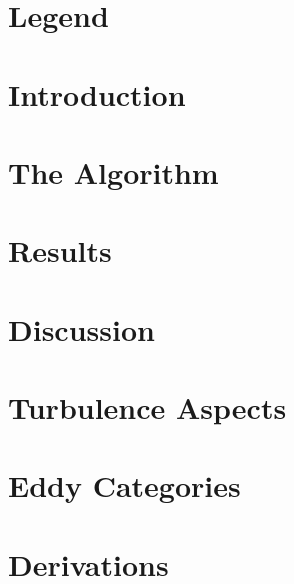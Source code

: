 


\frontmatter
%
%
%
\tableofcontents %
\chapter{Legend}
\newpage

\FloatBarrier

\mainmatter
\chapter{Introduction}

\chapter{The Algorithm}


\chapter{Results}

\chapter{Discussion}

\FloatBarrier

\appendix
\begin{small}
\begin{appendices}
\chapter{Turbulence Aspects}

\chapter{Eddy Categories}

%
\chapter{Derivations}

\end{appendices}
\end{small}
\FloatBarrier

